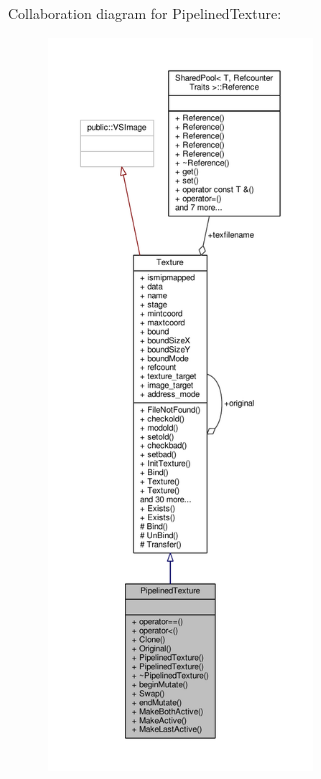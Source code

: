 Collaboration diagram for Pipelined\+Texture\+:
\nopagebreak
\begin{figure}[H]
\begin{center}
\leavevmode
\includegraphics[height=550pt]{d3/da2/classPipelinedTexture__coll__graph}
\end{center}
\end{figure}
